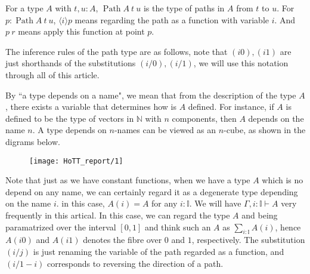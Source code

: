\documentclass[11pt]{article}
\DeclareMathOperator{\Path}{Path}
\begin{document}
For a type $A$ with $t,u:A$, $\Path A \ t \ u$ is the type of paths in $A$ from $t$ to $u$. For $p:\Path A \ t \ u$, $\langle i\rangle p$ means regarding the path as a function with variable $i$. And $p \ r$ means apply this function at point $p$.

The inference rules of the path type are as follows, note that $(i0),(i1)$ are just shorthands of the substitutions $(i/0),(i/1)$, we will use this notation through all of this article. 



By ``a type depends on a name", we mean that from the description of the type $A$, there exists a variable that determines how is $A$ defined. For instance, if $A$ is defined to be the type of vectors in $\mathbb N$ with $n$ components, then $A$ depends on the name $n$. A type depends on $n$-names can be viewed as an $n$-cube, as shown in the digrams below.
\begin{figure}[ht]
	\centering
	\texttt{[image: HoTT\_report/1]}
\end{figure}

Note that just as we have constant functions, when we have a type $A$ which is no depend on any name, we can certainly regard it as a degenerate type depending on the name $i$. in this case, $A(i)=A$ for any $i:\mathbb I$. We will have $\Gamma, i:{\mathbb I} \vdash A$ very frequently in this artical. In this case, we can regard the type $A$ and being paramatrized over the interval $[0,1]$ and think such an $A$ as $\sum_{i:\mathbb I}A(i)$, hence $A(i0)$ and $A(i1)$ denotes the fibre over $0$ and $1$, respectively. The substitution $(i/j)$ is just renaming the variable of the path regarded as a function, and $(i/1-i)$ corresponds to reversing the direction of a path.
\end{document}
